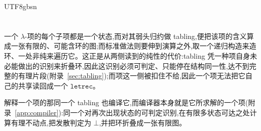 \begin{CJK*}{UTF8}{gbsn}
  \section{}\label{sec:conclusion}
  \ifTablambdaChinese
  一个 $\lambda$-项的每个子项都是一个状态,而对其弱头归约做 tabling,便把该项的含义算成一张有限的、可能含环的图;而标准做法则要伸到演算之外,取一个递归构造来造环、一处非纯来遍历它。这正是从两侧读到的纯性的代价:tabling 凭一种项自身未必能做出的识别来折叠环,因此这识别必须可判定、只能停在结构同一性,达不到完整的有理片段(附录~\ref{sec:tabling});而项这一侧被扣住不给,因此一个项无法把它自己的共享读回成一个 $\mathtt{letrec}$。

  解释一个项的那同一个 tabling 也编译它,而编译器本身就是它所求解的一个项(附录~\ref{app:compiler}):同一个对再次出现状态的可判定识别,在有限多状态可达之处计算有理不动点,把发散判定为 $\bot$,并把环折叠成一张有限图。


\end{CJK*}
